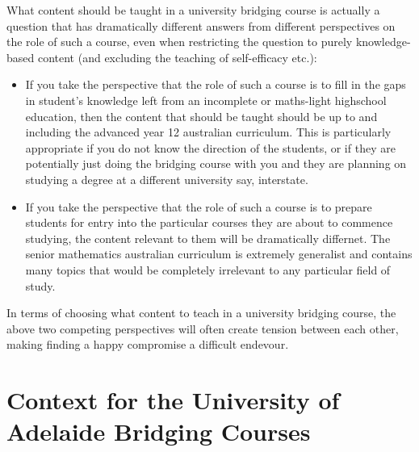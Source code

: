\documentclass[twoside,12pt,a4paper]{report}
\begin{document}
What content should be taught in a university bridging course is actually a question that has dramatically different answers from different perspectives on the role of such a course, even when restricting the question to purely knowledge-based content (and excluding the teaching of self-efficacy etc.):
\begin{itemize}
	\item If you take the perspective that the role of such a course is to fill in the gaps in student's knowledge left from an incomplete or maths-light highschool education, then the content that should be taught should be up to and including the advanced year 12 australian curriculum. This is particularly appropriate if you do not know the direction of the students, or if they are potentially just doing the bridging course with you and they are planning on studying a degree at a different university say, interstate.
	\item If you take the perspective that the role of such a course is to prepare students for entry into the particular courses they are about to commence studying, the content relevant to them will be dramatically differnet. The senior mathematics australian curriculum is extremely generalist and contains many topics that would be completely irrelevant to any particular field of study. 
\end{itemize}
In terms of choosing what content to teach in a university bridging course, the above two competing perspectives will often create tension between each other, making finding a happy compromise a difficult endevour. 

\section{Context for the University of Adelaide Bridging Courses}
\end{document}
